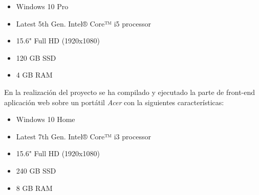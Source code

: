\documentclass{article}
\begin{document}
\begin{itemize}
	\item Windows 10 Pro
	\item Latest 5th Gen. Intel® Core™ i5 processor
	\item 15.6" Full HD (1920x1080)
	\item 120 GB SSD
	\item 4 GB RAM
\end{itemize}
En la realización del proyecto se ha compilado y ejecutado la parte de front-end aplicación web sobre un portátil \textit{Acer} con la siguientes características:
\begin{itemize}
	\item Windows 10 Home
	\item Latest 7th Gen. Intel® Core™ i3 processor
	\item 15.6" Full HD (1920x1080)
	\item 240 GB SSD
	\item 8 GB RAM
\end{itemize}
\end{document}
